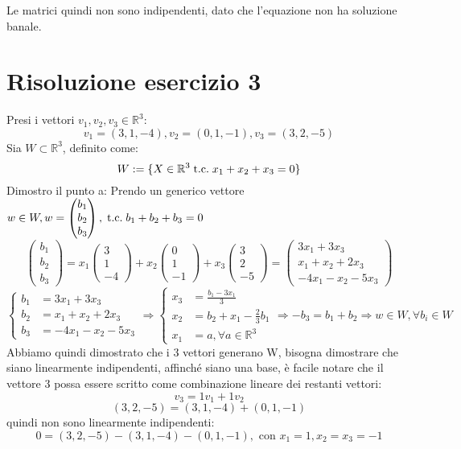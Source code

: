 \documentclass[a4paper,12pt]{article}
\begin{document}
	Le matrici quindi non sono indipendenti, dato che l'equazione non ha soluzione banale.
	
	\section{Risoluzione esercizio 3}
	Presi i vettori $v_1, v_2, v_3 \in \mathbb{R}^3$:
	\[v_1 = (3, 1, -4), v_2 = (0, 1, -1), v_3 = (3, 2, -5)\]
	Sia $W \subset \mathbb{R}^3$, definito come:
	\[W := \{X \in \mathbb{R}^3 \;\text{t.c.}\; x_1 + x_2 + x_3 = 0\}\]
	Dimostro il punto a:
	Prendo un generico vettore $w \in W, w = \begin{pmatrix} b_1 \\ b_2 \\ b_3 \end{pmatrix},\;\text{t.c.}\; b_1 + b_2 + b_3 = 0$
	\[\begin{pmatrix} b_1 \\ b_2 \\ b_3 \end{pmatrix} = x_1 \begin{pmatrix} 3 \\ 1 \\ -4 \end{pmatrix} + x_2 \begin{pmatrix} 0 \\ 1 \\ -1 \end{pmatrix} + x_3\begin{pmatrix} 3 \\ 2 \\ -5 \end{pmatrix} = \begin{pmatrix} 3x_1 + 3x_3 \\ x_1 + x_2 + 2x_3 \\ -4x_1 - x_2 -5x_3 \end{pmatrix}\]
	\[
	\left\{\begin{aligned}
		b_1 & = 3x_1 + 3x_3 \\
		b_2 & = x_1 + x_2 + 2x_3\\
		b_3 & = -4x_1 - x_2 -5x_3
	\end{aligned}\right.
	\Rightarrow 
	\left\{\begin{aligned}
		x_3 & = \frac{b_1 - 3x_1}{3} \\
		x_2 & = b_2 + x_1 - \frac{2}{3}b_1 \\
		x_1 & = a, \forall a \in \mathbb{R}^3
	\end{aligned}\right.
	\Rightarrow - b_3 = b_1 + b_2 \Rightarrow w \in W, \forall b_i \in W\]
	Abbiamo quindi dimostrato che i 3 vettori generano W, bisogna dimostrare che siano linearmente indipendenti, affinché siano una base, è facile notare che il vettore 3 possa essere scritto come combinazione lineare dei restanti vettori:
	\[v_3 = 1 v_1 + 1 v_2\]
	\[(3, 2, -5) = (3, 1, -4) + (0, 1, -1)\]
	quindi non sono linearmente indipendenti:
	\[0 = (3, 2, -5) - (3, 1, -4) - (0, 1, -1), \text{ con } x_1 = 1, x_2 = x_3 = -1\]
\end{document}
